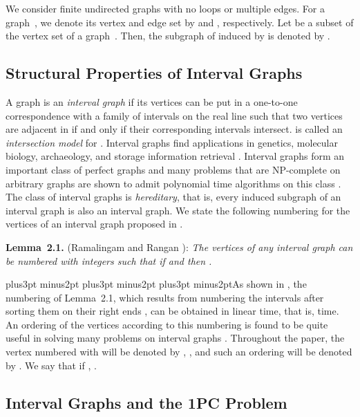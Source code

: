 \documentclass[10pt]{article}
\def\yskip{\penalty-50\vskip3pt plus3pt minus2pt}
\def\yyy{\yskip\yskip\yskip}
\begin{document}
We consider finite undirected graphs with no loops or multiple
edges. For a graph~, we denote its vertex and edge set by
 and , respectively. Let  be a subset of the vertex
set of a graph~. Then, the subgraph of  induced by  is
denoted by .


\vskip 0.2in \subsection{Structural Properties of Interval Graphs}

A graph  is an {\it interval graph} if its vertices can be put
in a one-to-one correspondence with a family  of intervals on
the real line such that two vertices are adjacent in  if and
only if their corresponding intervals intersect.  is called an
{\it intersection model} for  \cite{AR90}. Interval graphs find
applications in genetics, molecular biology, archaeology, and
storage information retrieval \cite{Gol}. Interval graphs form an
important class of perfect graphs \cite{Gol} and many problems
that are NP-complete on arbitrary graphs are shown to admit
polynomial time algorithms on this class \cite{AR90, Gol, Keil}.
The class of interval graphs is {\it hereditary}, that is, every
induced subgraph of an interval graph  is also an interval
graph. We state the following numbering for the vertices of an
interval graph proposed in \cite{RamRan}.

\medskip
\par\noindent
{\bf Lemma~2.1.} (Ramalingam and Rangan \cite{RamRan}): {\it The
vertices of any interval graph  can be numbered with integers
 such that if  and  then
.}

\yyy\noindent As shown in \cite{RamRan}, the numbering of
Lemma~2.1, which results from numbering the intervals after
sorting them on their right ends \cite{AR90}, can be obtained in
linear time, that is,  time. An ordering of the vertices
according to this numbering is found to be quite useful in solving
many problems on interval graphs \cite{AR90, RamRan}. Throughout
the paper, the vertex numbered with  will be denoted by ,
, and such an ordering will be denoted by .
We say that  if , .






\vskip 0.2in \subsection{Interval Graphs and the 1PC Problem}
\end{document}
